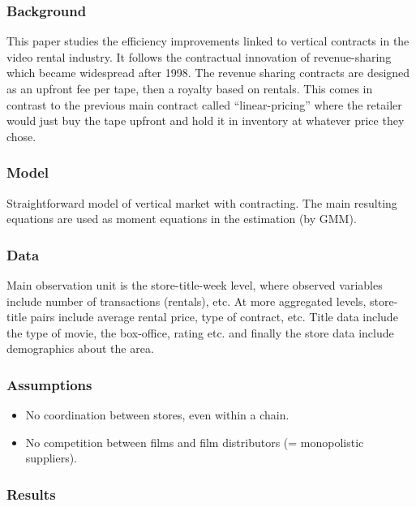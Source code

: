 \subsubsection{Background}

This paper studies the efficiency improvements linked to vertical contracts in the video rental industry. It follows the contractual innovation of revenue-sharing which became widespread after 1998. The revenue sharing contracts are designed as an upfront fee per tape, then a royalty based on rentals. This comes in contrast to the previous main contract called ``linear-pricing'' where the retailer would just buy the tape upfront and hold it in inventory at whatever price they chose.

\subsubsection{Model}

Straightforward model of vertical market with contracting. The main resulting equations are used as moment equations in the estimation (by GMM).

\subsubsection{Data}

Main observation unit is the store-title-week level, where observed variables include number of transactions (rentals), etc. At more aggregated levels, store-title pairs include average rental price, type of contract, etc. Title data include the type of movie, the box-office, rating etc. and finally the store data include demographics about the area.

\subsubsection{Assumptions}

\begin{itemize}
\item No coordination between stores, even within a chain.
\item No competition between films and film distributors (= monopolistic suppliers).
\end{itemize}

\subsubsection{Results}

